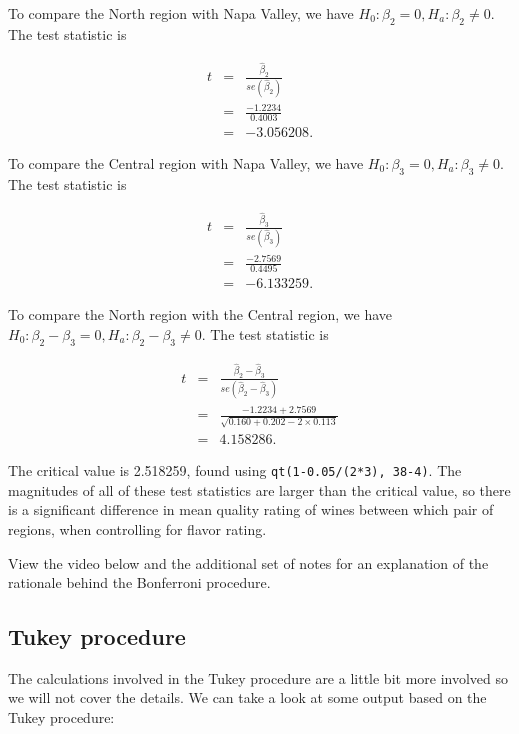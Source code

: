 \documentclass[
]{book}
\begin{document}
To compare the North region with Napa Valley, we have \(H_0: \beta_2 = 0, H_a: \beta_2 \neq 0\). The test statistic is

\begin{eqnarray*}
t &=& \frac{\hat{\beta}_2}{se(\hat{\beta}_2)} \nonumber \\
  &=& \frac{-1.2234}{0.4003} \nonumber \\
  &=& -3.056208.
\end{eqnarray*}

To compare the Central region with Napa Valley, we have \(H_0: \beta_3 = 0, H_a: \beta_3 \neq 0\). The test statistic is

\begin{eqnarray*}
t &=& \frac{\hat{\beta}_3}{se(\hat{\beta}_3)} \nonumber \\
  &=& \frac{-2.7569}{0.4495} \nonumber \\
  &=& -6.133259.
\end{eqnarray*}

To compare the North region with the Central region, we have \(H_0: \beta_2 - \beta_3 = 0, H_a: \beta_2 - \beta_3 \neq 0\). The test statistic is

\begin{eqnarray*}
t &=& \frac{\hat{\beta}_2 - \hat{\beta}_3}{se(\hat{\beta}_2 - \hat{\beta}_3)} \nonumber \\
  &=& \frac{-1.2234 + 2.7569}{\sqrt{0.160 + 0.202 - 2 \times 0.113}} \nonumber \\
  &=& 4.158286.
\end{eqnarray*}

The critical value is 2.518259, found using \texttt{qt(1-0.05/(2*3),\ 38-4)}. The magnitudes of all of these test statistics are larger than the critical value, so there is a significant difference in mean quality rating of wines between which pair of regions, when controlling for flavor rating.

View the video below and the additional set of notes for an explanation of the rationale behind the Bonferroni procedure.

\hypertarget{tukey-procedure}{%
\subsection{Tukey procedure}\label{tukey-procedure}}

The calculations involved in the Tukey procedure are a little bit more involved so we will not cover the details. We can take a look at some output based on the Tukey procedure:
\end{document}
